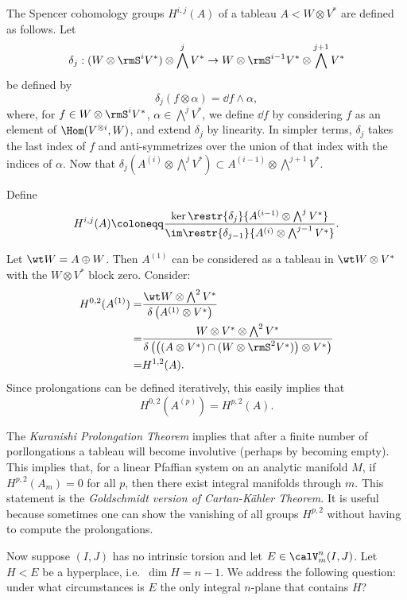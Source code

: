 \begin{defn}
    The Spencer cohomology groups $H^{i,j}(A)$ of a tableau $A<W\otimes V^\ast$ are defined as follows. Let 
    \[\delta_j:(W\otimes \rmS^iV^\ast)\otimes \bigwedge^j V^\ast\to W\otimes \rmS^{i-1}V^\ast\otimes \bigwedge^{j+1}V^\ast\]
    be defined by 
    \[\delta_j(f\otimes \alpha)=\dd f\wedge \alpha,\]
    where, for $f\in W\otimes \rmS^i V^\ast$, $\alpha\in \bigwedge^j V^\ast$, we define $\dd f$ by considering $f$ as an element of $\Hom(V^{\otimes i},W)$, and extend $\delta_j$ by linearity. In simpler terms, $\delta_j$ takes the last index of $f$ and anti-symmetrizes over the union of that index with the indices of $\alpha$. Now that $\delta_j(A^{(i)}\otimes \bigwedge^j V^\ast)\subset A^{(i-1)}\otimes\bigwedge^{j+1}V^\ast$.

    Define 
    \[H^{i,j}(A)\coloneqq \frac{\ker\restr{\delta_j}{A^{(i-1)}\otimes \bigwedge^jV^\ast}}{\im \restr{\delta_{j-1}}{A^{(i)}\otimes \bigwedge^{j-1}V^\ast}}.\]
\end{defn}

Let $\wt W=A\oplus W$. Then $A^{(1)}$ can be considered as a tableau in $\wt W\otimes V^\ast$ with the $W\otimes V^\ast$ block zero. Consider:
\begin{align}
    H^{0,2}(A^{(1)})=& \frac{\wt W\otimes \bigwedge^2 V^\ast}{\delta\left(A^{(1)}\otimes V^\ast\right)}\\
    =& \frac{W\otimes V^\ast\otimes \bigwedge^2 V^\ast}{\delta\left(\left((A\otimes V^\ast)\cap (W\otimes \rmS^2 V^\ast)\right)\otimes V^\ast\right)}\\
    =&H^{1,2}(A).
\end{align}
Since prolongations can be defined iteratively, this easily implies that 
\[H^{0,2}(A^{(p)})=H^{p,2}(A).\]

\begin{rem}
    The \emph{Kuranishi Prolongation Theorem} implies that after a finite number of porllongations a tableau will become involutive (perhaps by becoming empty). This implies that, for a linear Pfaffian system on an analytic manifold $M$, if $H^{p,2}(A_m)=0$ for all $p$, then there exist integral manifolds through $m$. This statement is the \emph{Goldschmidt version of Cartan-K\"ahler Theorem}. It is useful because sometimes one can show the vanishing of all groups $H^{p,2}$ without having to compute the prolongations.
\end{rem}

Now suppose $(I,J)$ has no intrinsic torsion and let $E\in\calV^n_m(I,J)$. Let $H<E$ be a hyperplace, i.e.\ $\dim H=n-1$. We address the following question: under what circumstances is $E$ the only integral $n$-plane that contains $H$?

